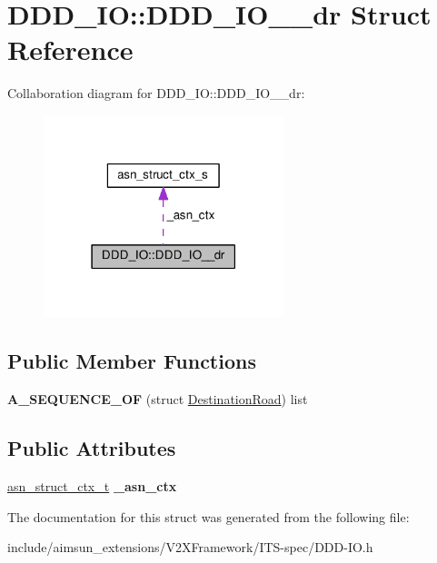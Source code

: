 \hypertarget{structDDD__IO_1_1DDD__IO____dr}{}\section{D\+D\+D\+\_\+\+IO\+:\+:D\+D\+D\+\_\+\+I\+O\+\_\+\+\_\+dr Struct Reference}
\label{structDDD__IO_1_1DDD__IO____dr}


Collaboration diagram for D\+D\+D\+\_\+\+IO\+:\+:D\+D\+D\+\_\+\+I\+O\+\_\+\+\_\+dr\+:\nopagebreak
\begin{figure}[H]
\begin{center}
\leavevmode
\includegraphics[width=198pt]{structDDD__IO_1_1DDD__IO____dr__coll__graph}
\end{center}
\end{figure}
\subsection*{Public Member Functions}
\begin{DoxyCompactItemize}
\item 
{\bfseries A\+\_\+\+S\+E\+Q\+U\+E\+N\+C\+E\+\_\+\+OF} (struct \hyperlink{structDestinationRoad}{Destination\+Road}) list\hypertarget{structDDD__IO_1_1DDD__IO____dr_a09f6c70b2901a6a602145a41d49eb185}{}\label{structDDD__IO_1_1DDD__IO____dr_a09f6c70b2901a6a602145a41d49eb185}

\end{DoxyCompactItemize}
\subsection*{Public Attributes}
\begin{DoxyCompactItemize}
\item 
\hyperlink{structasn__struct__ctx__s}{asn\+\_\+struct\+\_\+ctx\+\_\+t} {\bfseries \+\_\+asn\+\_\+ctx}\hypertarget{structDDD__IO_1_1DDD__IO____dr_a04f32ac54a39929714aa9d102ff4011e}{}\label{structDDD__IO_1_1DDD__IO____dr_a04f32ac54a39929714aa9d102ff4011e}

\end{DoxyCompactItemize}


The documentation for this struct was generated from the following file\+:\begin{DoxyCompactItemize}
\item 
include/aimsun\+\_\+extensions/\+V2\+X\+Framework/\+I\+T\+S-\/spec/D\+D\+D-\/\+I\+O.\+h\end{DoxyCompactItemize}
